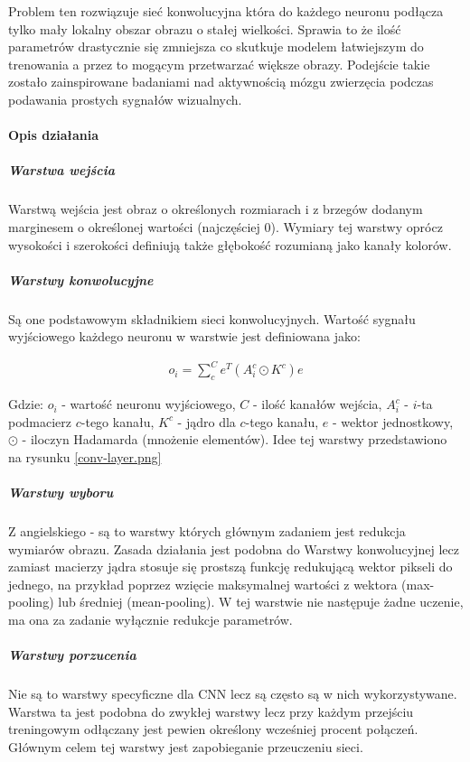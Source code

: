 Problem ten rozwiązuje sieć konwolucyjna która do każdego neuronu podłącza tylko mały lokalny obszar obrazu o stałej wielkości. Sprawia to że ilość parametrów drastycznie się zmniejsza co skutkuje modelem łatwiejszym do trenowania a przez to mogącym przetwarzać większe obrazy. Podejście takie zostało zainspirowane badaniami nad aktywnością mózgu zwierzęcia podczas podawania prostych sygnałów wizualnych.\cite{CNN-cat}
\paragraph{Opis działania}
\subparagraph{Warstwa wejścia} 
Warstwą wejścia jest obraz o określonych rozmiarach i z brzegów dodanym marginesem  o określonej wartości (najczęściej 0). Wymiary tej warstwy oprócz wysokości i szerokości definiują także głębokość rozumianą jako kanały kolorów. \cite{CNN-expl}
\subparagraph{Warstwy konwolucyjne} 
Są one podstawowym składnikiem sieci konwolucyjnych. Wartość sygnału wyjściowego każdego neuronu w warstwie jest definiowana jako:

\begin{align*}
	o_i = \sum^C_c e^T(A^c_i \odot K^c)e
\end{align*}

Gdzie: $o_i$ - wartość neuronu wyjściowego, $C$ - ilość kanałów wejścia, $A^c_i$ - $i$-ta podmacierz $c$-tego kanału, $K^c$ - jądro dla $c$-tego kanału, $e$ - wektor jednostkowy, $\odot$ - iloczyn Hadamarda (mnożenie elementów)\cite{CNN-intro}.
Idee tej warstwy przedstawiono na rysunku \ref{conv-layer.png} \cite{CNN-intro}


\subparagraph{Warstwy wyboru}
Z angielskiego  - są to warstwy których głównym zadaniem jest redukcja wymiarów obrazu. Zasada działania jest podobna do Warstwy konwolucyjnej lecz zamiast macierzy jądra stosuje się prostszą funkcję redukującą wektor pikseli do jednego, na przykład poprzez wzięcie maksymalnej wartości z wektora (max-pooling) lub średniej (mean-pooling). W tej warstwie nie następuje żadne uczenie, ma ona za zadanie wyłącznie redukcje parametrów. \cite{CNN-intro}
\subparagraph{Warstwy porzucenia}
Nie są to warstwy specyficzne dla CNN lecz są często są w nich wykorzystywane. Warstwa ta jest podobna do zwykłej warstwy  lecz przy każdym przejściu treningowym odłączany jest pewien określony wcześniej procent połączeń. Głównym celem tej warstwy jest zapobieganie przeuczeniu sieci. \cite{CNN-expl}

